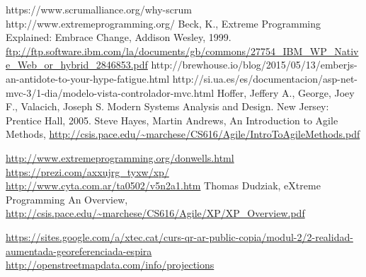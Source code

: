 \begin{thebibliography}{99}
	 https://www.scrumalliance.org/why-scrum
	 http://www.extremeprogramming.org/
	 Beck, K., Extreme Programming Explained: Embrace Change, Addison Wesley, 1999.
	  \url{ftp://ftp.software.ibm.com/la/documents/gb/commons/27754_IBM_WP_Native_Web_or_hybrid_2846853.pdf}
	 http://brewhouse.io/blog/2015/05/13/emberjs-an-antidote-to-your-hype-fatigue.html
	 http://si.ua.es/es/documentacion/asp-net-mvc-3/1-dia/modelo-vista-controlador-mvc.html
	 Hoffer, Jeffery A., George, Joey F., Valacich, Joseph S. Modern Systems Analysis and Design. New Jersey: Prentice Hall, 2005.
	 Steve Hayes, Martin Andrews, An Introduction to Agile Methods, \url{http://csis.pace.edu/~marchese/CS616/Agile/IntroToAgileMethods.pdf}

	  \url{http://www.extremeprogramming.org/donwells.html}
	 \url{https://prezi.com/axxujrg_tyxw/xp/}
	 \url{http://www.cyta.com.ar/ta0502/v5n2a1.htm}
	 Thomas Dudziak, eXtreme Programming
An Overview, \url{http://csis.pace.edu/~marchese/CS616/Agile/XP/XP_Overview.pdf}

	 \url{https://sites.google.com/a/xtec.cat/curs-qr-ar-public-copia/modul-2/2-realidad-aumentada-georeferenciada-espira}
	 \url{http://openstreetmapdata.com/info/projections}


\end{thebibliography}
